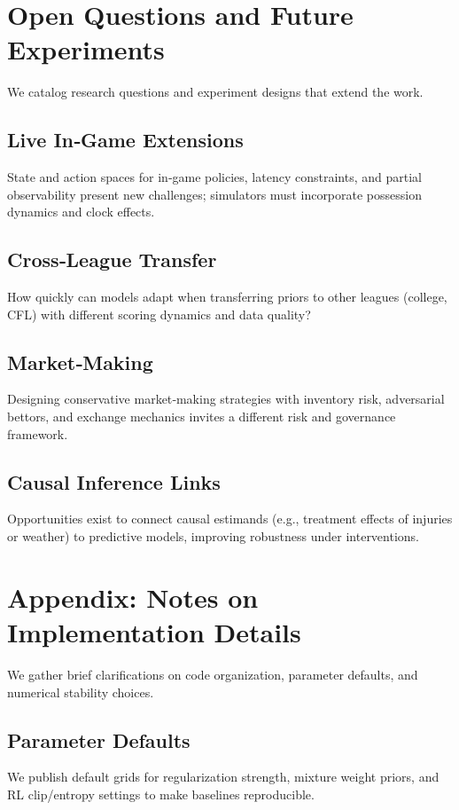 \documentclass[12pt]{report}  %
\numberwithin{equation}{section}
\theoremstyle{plain}
\theoremstyle{definition}
\theoremstyle{remark}
\begin{document}
\chapter{Open Questions and Future Experiments}
We catalog research questions and experiment designs that extend the work.

\section{Live In‑Game Extensions}
State and action spaces for in‑game policies, latency constraints, and partial observability present new challenges; simulators must incorporate possession dynamics and clock effects.

\section{Cross‑League Transfer}
How quickly can models adapt when transferring priors to other leagues (college, CFL) with different scoring dynamics and data quality?

\section{Market‑Making}
Designing conservative market‑making strategies with inventory risk, adversarial bettors, and exchange mechanics invites a different risk and governance framework.

\section{Causal Inference Links}
Opportunities exist to connect causal estimands (e.g., treatment effects of injuries or weather) to predictive models, improving robustness under interventions.

\chapter{Appendix: Notes on Implementation Details}
We gather brief clarifications on code organization, parameter defaults, and numerical stability choices.

\section{Parameter Defaults}
We publish default grids for regularization strength, mixture weight priors, and RL clip/entropy settings to make baselines reproducible.
\end{document}
